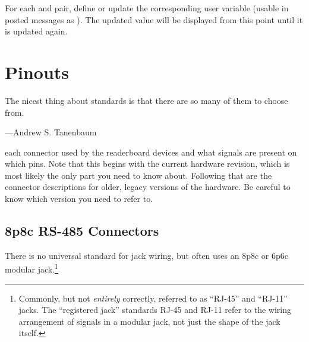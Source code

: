 For each  and  pair, define or update the corresponding
user variable (usable in posted messages as \z{\{\$}\z{\}}). The
updated value will be displayed from this point until it is updated again.

%                                         
\chapter{Pinouts}
\epigraph{The nicest thing about standards is that there are so many of them to choose from.}{---Andrew S. Tanenbaum}
 each connector used by the readerboard devices and what signals are present
on which pins. Note that this begins with the current hardware revision, which is most likely the only part you need
to know about. Following that are the connector descriptions for older, legacy versions of the hardware. Be careful to
know which version you need to refer to.

\section{8p8c RS-485 Connectors}
There is no universal standard for  jack wiring, but often uses an 8p8c or 6p6c modular jack.\footnote{Commonly, but not \emph{entirely} correctly, referred to as
``RJ-45'' and ``RJ-11'' jacks. The ``registered jack'' standards RJ-45 and RJ-11 refer to the wiring arrangement of signals in a modular jack, not just the shape of the jack itself.}

